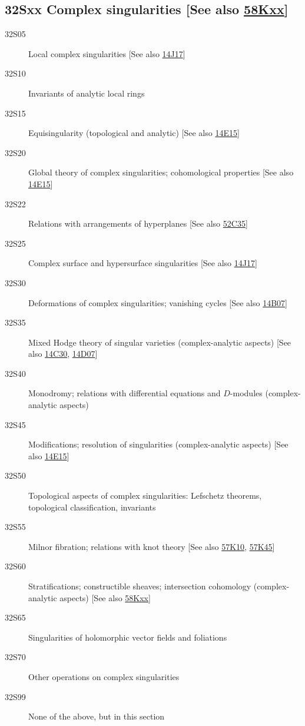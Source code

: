 \documentclass[letterpaper]{article}
\begin{document}
\subsection*{32Sxx  Complex singularities [See also \hyperref[58Kxx]{58Kxx}] }\label{32Sxx}
\begin{description}  
\item [32S05]\label{32S05} Local complex singularities [See also \hyperref[14J17]{14J17}]
\item [32S10]\label{32S10} Invariants of analytic local rings
\item [32S15]\label{32S15} Equisingularity (topological and analytic) [See also \hyperref[14E15]{14E15}]
\item [32S20]\label{32S20} Global theory of complex singularities; cohomological properties [See also \hyperref[14E15]{14E15}]
\item [32S22]\label{32S22} Relations with arrangements of hyperplanes [See also \hyperref[52C35]{52C35}]
\item [32S25]\label{32S25} Complex surface and hypersurface singularities [See also \hyperref[14J17]{14J17}]
\item [32S30]\label{32S30} Deformations of complex singularities; vanishing cycles [See also \hyperref[14B07]{14B07}]
\item [32S35]\label{32S35} Mixed Hodge theory of singular varieties (complex-analytic aspects) [See also \hyperref[14C30]{14C30}, \hyperref[14D07]{14D07}]
\item [32S40]\label{32S40} Monodromy; relations with differential equations and $D$-modules (complex-analytic aspects) 
\item [32S45]\label{32S45} Modifications; resolution of singularities (complex-analytic aspects) [See also \hyperref[14E15]{14E15}]
\item [32S50]\label{32S50} Topological aspects of complex singularities: Lefschetz theorems, topological classification, invariants
\item [32S55]\label{32S55} Milnor fibration; relations with knot theory [See also \hyperref[57K10]{57K10}, \hyperref[57K45]{57K45}]
\item [32S60]\label{32S60} Stratifications; constructible sheaves; intersection cohomology (complex-analytic aspects) [See also \hyperref[58Kxx]{58Kxx}]
\item [32S65]\label{32S65} Singularities of holomorphic vector fields and foliations
\item [32S70]\label{32S70} Other operations on complex singularities
\item [32S99]\label{32S99} None of the above, but in this section
\end{description}
\end{document}
